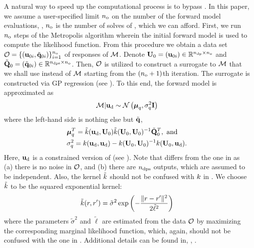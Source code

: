 A natural way to speed up the computational process is to bypass . In this paper, we assume a user-specified limit ${n_\text{o}}$ on the number of the forward model evaluations, \ie, ${n_\text{o}}$ is the number of solves of , which we can afford. First, we run ${n_\text{o}}$ steps of the Metropolis algorithm wherein the initial forward model is used to compute the likelihood function. From this procedure we obtain a data set $\mathcal{O} = \{ (\mathbf{u}_{0i}, \tilde{\mathbf{q}}_{0i}) \}_{i = 1}^{n_\text{o}}$ of responses of $\model$. Denote $\mathbf{U}_0 = (\mathbf{u}_{0i}) \in \mathbb{R}^{{n_\text{dp}} \times {n_\text{o}}}$ and $\tilde{\mathbf{Q}}_0 = (\tilde{\mathbf{q}}_{0i}) \in \mathbb{R}^{{n_\text{dps}} \times {n_\text{o}}}$. Then, $\mathcal{O}$ is utilized to construct a surrogate to $\model$ that we shall use instead of $\model$ starting from the $({n_\text{o}} + 1)$th iteration. The surrogate is constructed via GP regression (see ). To this end, the forward model is approximated as
\begin{equation} \elabel{gp-approximation}
  \model | \vu_\data \sim \gaussian{\vmean_\T}{\sigma^2_\T \mI}
\end{equation}
where the left-hand side is nothing else but $\tilde{\mathbf{q}}$,
\begin{align}
  & \vmean_\T^T = \tilde{\fCov}(\vu_\data, \mU_0) \tilde{\fCov}(\mU_0, \mU_0)^{-1} \mmT_0^T, \text{ and} \elabel{gp-mean} \\
  & \sigma^2_\T = \fCov{\vu_\data, \vu_\data} - \fCov{\mU_0, \mU_0}^{-1} \fCov{\mU_0, \vu_\data}. \elabel{gp-variance}
\end{align}
Here, $\mathbf{u}_{\text{d}}$ is a constrained version of  (see ). Note that  differs from the one in  as (a) there is no noise in $\mathcal{O}$, and (b) there are ${n_\text{dps}}$ outputs, which are assumed to be independent. Also, the kernel $\tilde{\fCov}$ should not be confused with $\fCov$ in . We choose $\tilde{\fCov}$ to be the squared exponential kernel:
\[
  \tilde{\fCov}(\r, \r') = \tilde{\sigma}^2 \exp\left(-\frac{\norm{\r - \r'}^2}{2 \tilde{\ell}^2}\right)
\]
where the parameters $\tilde{\sigma}^2$ and $\tilde{\ell}$ are estimated from the data $\mathcal{O}$ by maximizing the corresponding marginal likelihood function, which, again, should not be confused with the one in . Additional details can be found in, \eg, \cite{mackay2003, rasmussen2006}.

